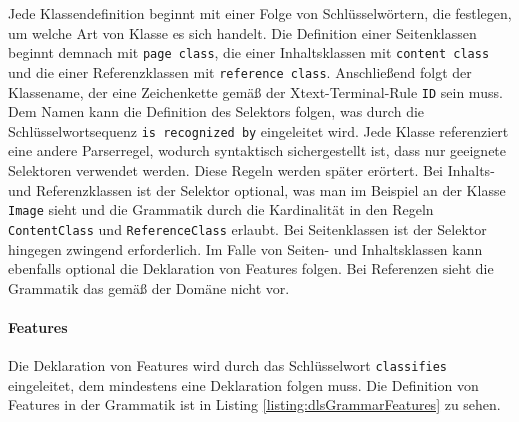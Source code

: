     Jede Klassendefinition beginnt mit einer Folge von Schlüsselwörtern,
    die festlegen, um welche Art von Klasse es sich handelt.
    Die Definition einer Seitenklassen beginnt demnach mit \texttt{page class},
    die einer Inhaltsklassen mit \texttt{content class} und die einer
    Referenzklassen mit \texttt{reference class}.
    Anschließend folgt der Klassename, der eine Zeichenkette gemäß
    der Xtext-Terminal-Rule \texttt{ID} \cite[Kapitel "`Common Terminals"']{xtext:documentation} sein muss.
    Dem Namen kann die Definition des Selektors folgen,
    was durch die Schlüsselwortsequenz \texttt{is recognized by} eingeleitet wird.
    Jede Klasse referenziert eine andere Parserregel,
    wodurch syntaktisch sichergestellt ist, dass nur geeignete Selektoren
    verwendet werden.
    Diese Regeln werden später erörtert.
    Bei Inhalts- und Referenzklassen ist der Selektor optional,
    was man im Beispiel an der Klasse \texttt{Image} sieht und
    die Grammatik durch die Kardinalität in den Regeln \texttt{ContentClass}
    und \texttt{ReferenceClass} erlaubt.
    Bei Seitenklassen ist der Selektor hingegen zwingend erforderlich.
    Im Falle von Seiten- und Inhaltsklassen kann ebenfalls optional die Deklaration von Features folgen.
    Bei Referenzen sieht die Grammatik das gemäß der Domäne nicht vor.

    \paragraph{Features}
    Die Deklaration von Features wird durch das Schlüsselwort \texttt{classifies} eingeleitet,
    dem mindestens eine Deklaration folgen muss.
    Die Definition von Features in der Grammatik ist in Listing \ref{listing:dlsGrammarFeatures} zu sehen.

    

